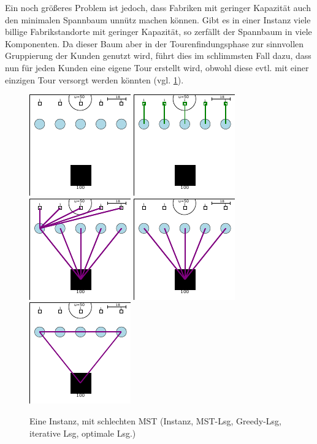 \documentclass[a4paper,ngerman,11pt,bibtotoc]{scrartcl}
\theoremstyle{definition}
\theoremstyle{plain}
\theoremstyle{remark}
\newcommand{\MST}{MST}
\begin{document}
	Ein noch größeres Problem ist jedoch, dass Fabriken mit geringer Kapazität auch den minimalen Spannbaum unnütz machen können. Gibt es in einer Instanz viele billige Fabrikstandorte mit geringer Kapazität, so zerfällt der Spannbaum in viele Komponenten. Da dieser Baum aber in der Tourenfindungsphase zur sinnvollen Gruppierung der Kunden genutzt wird, führt dies im schlimmsten Fall dazu, dass nun für jeden Kunden eine eigene Tour erstellt wird, obwohl diese evtl. mit einer einzigen Tour versorgt werden könnten (vgl. \cref{fig:bsp:schlechterMST}).
	
	\begin{figure}[h]\centering
		\includegraphics[width=.19\textwidth]{bilder/beispiele/bsp3-instance.pdf}
		\includegraphics[width=.19\textwidth]{bilder/beispiele/bsp3-MST.pdf}
		\includegraphics[width=.19\textwidth]{bilder/beispiele/bsp3-Greedy.pdf}
		\includegraphics[width=.19\textwidth]{bilder/beispiele/bsp3-It.pdf}
		\includegraphics[width=.19\textwidth]{bilder/beispiele/bsp3-OPT.pdf}
		\caption{Eine Instanz, mit schlechten \MST{} (Instanz, \MST-Lsg, Greedy-Lsg, iterative Lsg, optimale Lsg.)}\label{fig:bsp:schlechterMST}
	\end{figure}
\end{document}
